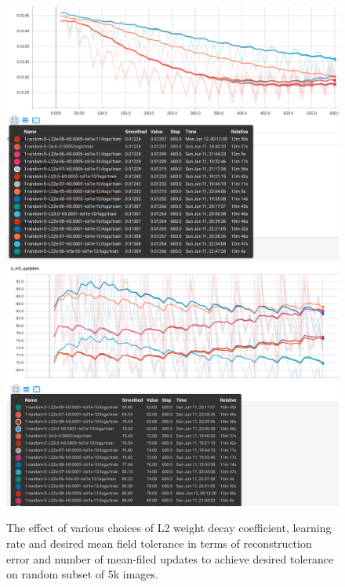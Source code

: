 \begin{figure}[h]
\begin{mdframed}
\centering
\includegraphics[width=4.6in]{dbm-mnist/L2_lr_tol_5k.png}
\\[2em]
\includegraphics[width=4.6in]{dbm-mnist/n_mf_upd_5k.png}
\caption{The effect of various choices of L2 weight decay coefficient, learning rate and desired mean field tolerance in terms of reconstruction error and number of mean-filed updates to achieve desired tolerance on random subset of 5k images.}
\end{mdframed}
\end{figure}

\clearpage

